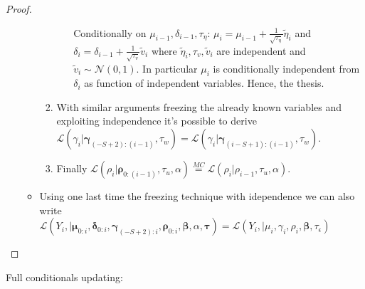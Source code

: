 \documentclass[11pt,twoside]{report}
\begin{document}
\begin{proof}
\begin{enumerate}
\begin{itemize}
\begin{enumerate}
\begin{enumerate}
			Conditionally on $ \mu_{i-1}, \delta_{i-1},\tau_\eta $: $ \mu_i = \mu_{i-1} + \frac{1}{\sqrt{\tau_\eta}}\tilde{\eta}_i $ and $ \delta_i=\delta_{i-1}+\frac{1}{\sqrt{\tau_v}}\tilde{v}_i $ where $  \tilde{\eta}_i,  \tau_v, \tilde{v}_i$ are independent and $ \tilde{v}_i\sim\mathcal{N}(0,1) $. In particular $ \mu_i $ is conditionally independent from $ \delta_i $ as function of independent variables. Hence, the thesis.
		\end{enumerate}
		\item With similar arguments freezing the already known variables and exploiting independence it's possible to derive $\mathcal{L}(\gamma_i| \boldsymbol{\gamma}_{(-S+2):(i-1)}, \tau_w) = \mathcal{L}(\gamma_i| \boldsymbol{\gamma}_{(i-S+1):(i-1)}, \tau_w)$.
		\item Finally $ \mathcal{L}(\rho_i|\boldsymbol{\rho}_{0:(i-1)},\tau_u, \alpha)\overset{MC}{=}\mathcal{L}(\rho_i|\rho_{i-1},\tau_u, \alpha) $.
	\end{enumerate}
	\item Using one last time the freezing technique with idependence we can also  write \\$ \mathcal{L}(Y_i,| \boldsymbol{\mu}_{0:i}, \boldsymbol{\delta}_{0:i}, \boldsymbol{\gamma}_{(-S+2):i}, \boldsymbol{\rho}_{0:i}, \boldsymbol{\beta}, \alpha, \boldsymbol{\tau}) = \mathcal{L}(Y_i,| \mu_i, \gamma_i, \rho_i, \boldsymbol{\beta}, \tau_\epsilon)$
\end{itemize}
\end{enumerate}
\end{proof}
\newpage
Full conditionals updating:
\end{document}
